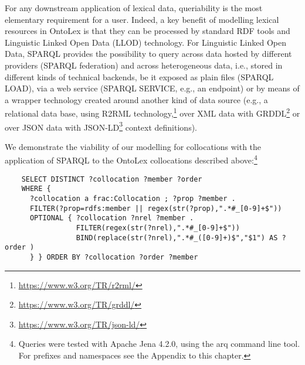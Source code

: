 \documentclass[output=paper,colorlinks,citecolor=brown]{langscibook}
\begin{document}
\begin{sloppypar}
    For any downstream application of
lexical data,
    queriability is the most elementary requirement for a user. Indeed, a key benefit of modelling lexical resources in OntoLex is that they can be processed by standard RDF tools and Linguistic Linked Open Data (LLOD) technology.
For Linguistic Linked Open Data, SPARQL provides
    the possibility to query across data hosted by different providers (SPARQL federation) and across heterogeneous data, i.e., stored in different kinds of technical backends, be it exposed as plain files (SPARQL LOAD), via a web service (SPARQL SERVICE, e.g., an endpoint) or by means of a wrapper technology created around another kind of data source (e.g., a relational data base, using R2RML technology,\footnote{\url{https://www.w3.org/TR/r2rml/}} over XML data with GRDDL\footnote{\url{https://www.w3.org/TR/grddl/}} or over JSON data with JSON-LD\footnote{\url{https://www.w3.org/TR/json-ld/}} context definitions).
\end{sloppypar}
    
We demonstrate the viability of our modelling for collocations with
    the application of SPARQL to the OntoLex collocations described above:\footnote{%
        Queries were tested with Apache Jena 4.2.0, using the arq command line tool.
For prefixes and namespaces
see the Appendix to this chapter.
    }

{\listingsize
\begin{verbatim}
    SELECT DISTINCT ?collocation ?member ?order
    WHERE {
      ?collocation a frac:Collocation ; ?prop ?member .
      FILTER(?prop=rdfs:member || regex(str(?prop),".*#_[0-9]+$"))
      OPTIONAL { ?collocation ?nrel ?member .
                 FILTER(regex(str(?nrel),".*#_[0-9]+$"))
                 BIND(replace(str(?nrel),".*#_([0-9]+)$","$1") AS ?order )
      } } ORDER BY ?collocation ?order ?member
\end{verbatim}
}
\end{document}
